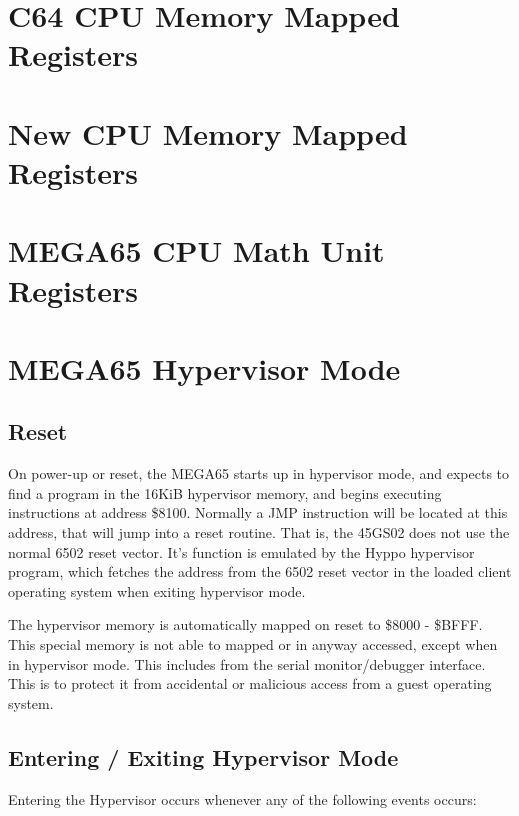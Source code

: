 \section{C64 CPU Memory Mapped Registers}



\section{New CPU Memory Mapped Registers}



\section{MEGA65 CPU Math Unit Registers}



\section{MEGA65 Hypervisor Mode}
\label{sec:hypervisor-mode}

\subsection{Reset}

On power-up or reset, the MEGA65 starts up in hypervisor mode, and expects to find a program in the
16KiB hypervisor memory, and begins executing instructions at address \$8100.  Normally a JMP instruction
will be located at this address, that will jump into a reset routine. That is, the 45GS02
does not use the normal 6502 reset vector. It's function is emulated by the Hyppo hypervisor program,
which fetches the address from the 6502 reset vector in the loaded client operating system when
exiting hypervisor mode.

The hypervisor memory is automatically mapped on reset to \$8000 - \$BFFF.  This special memory is not
able to mapped or in anyway accessed, except when in hypervisor mode. This includes from the serial monitor/debugger
interface.  This is to protect it from accidental or malicious access from a guest operating system.

\subsection{Entering / Exiting Hypervisor Mode}

Entering the Hypervisor occurs whenever any of the following events occurs:

